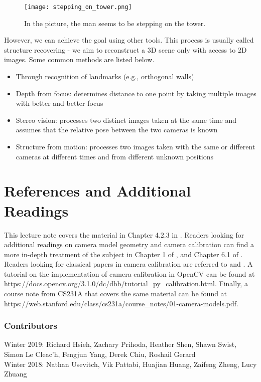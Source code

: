 \documentclass[]{article}
\begin{document}
\begin{figure}[H]
\texttt{[image: stepping\_on\_tower.png]}
\centering
\caption{In the picture, the man seems to be stepping on the tower.}
\label{fig:stepping_on_tower}
\end{figure}

However, we can achieve the goal using other tools. This process is usually called structure recovering - we aim to reconstruct a 3D scene only with access to 2D images. Some common methods are listed below.

\begin{itemize}
  \item Through	recognition of landmarks (e.g., orthogonal walls)
  \item Depth from focus: determines distance to one point by taking multiple images with better and better focus
  \item Stereo vision: processes two distinct images taken at the same time and assumes that the relative pose between the two cameras is known
  \item Structure from motion: processes two images taken with the same or different cameras at different times and from different unknown positions
\end{itemize}


\section{References and Additional Readings}
This lecture note covers the material in Chapter 4.2.3 in \cite{SNS}. Readers looking for additional readings on camera model geometry and camera calibration can find a more in-depth treatment of the subject in Chapter 1 of \cite{FP}, and Chapter 6.1 of \cite{HZ}. Readers looking for classical papers in camera calibration are referred to \cite{tsai1987versatile} and \cite{zhang2000flexible}. A tutorial on the implementation of camera calibration in OpenCV \cite{opencv_library} can be found at https://docs.opencv.org/3.1.0/dc/dbb/tutorial\_py\_calibration.html. Finally, a course note from CS231A that covers the same material can be found at https://web.stanford.edu/class/cs231a/course\_notes/01-camera-models.pdf.



\subsubsection*{Contributors}
Winter 2019: Richard Hsieh, Zachary Prihoda, Heather Shen, Shawn Swist, Simon Le Cleac'h, Fengjun Yang, Derek Chiu, Roshail Gerard
\\
Winter 2018: Nathan Usevitch, Vik Pattabi, Huajian Huang, Zaifeng Zheng, Lucy Zhuang
\end{document}
